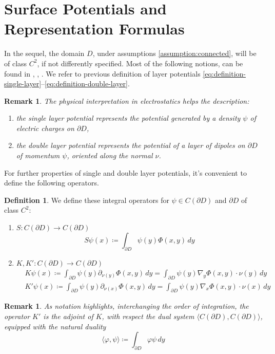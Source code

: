 \documentclass[10pt, a4paper, twoside, openright]{book}
\theoremstyle{definition}
\newtheorem{definition}[subsection]{Definition}
\theoremstyle{plain}
\theoremstyle{plain}
\theoremstyle{plain}
\theoremstyle{plain}
\newtheorem{remark}[subsection]{Remark}
\theoremstyle{plain}
\theoremstyle{plain}
\theoremstyle{plain}
\theoremstyle{plain}
\let\phi\varphi
\begin{document}
\section{Surface Potentials and Representation Formulas}
In the sequel, the domain $D$, under assumptions \ref{assumption:connected}, will be of class $C^2$, if not differently specified.
Most of the following notions, can be found in \cite{kirsch:book}, \cite{colton-kress:book}, \cite{salsa:book}.
We refer to previous definition of layer potentials \eqref{eq:definition-single-layer}--\eqref{eq:definition-double-layer}.
\begin{remark}
The physical interpretation in electrostatics helps the description:
\begin{enumerate}
 \item the single layer potential represents the potential generated by a density $\psi$ of electric charges on $\partial D$,
 \item the double layer potential represents the potential of a layer of dipoles on $\partial D$ of momentum $\psi$, oriented along the normal $\nu$.
\end{enumerate}
\end{remark}
For further properties of single and double layer potentials, it's convenient to define the following operators.
\begin{definition}
 We define these integral operators for $\psi\in C(\partial D)$ and $\partial D$ of class $C^2$:
 \begin{enumerate}
  \item  $ S: C(\partial D) \to C(\partial D)$
  \begin{equation}
  S\psi(x)\coloneqq\int_{\partial D}\psi(y) \Phi(x,y)\,dy\label{def:operator-S}
  \end{equation}
  \item  $ K,K':C(\partial D) \to C(\partial D)$
  \begin{align}
  & K\psi(x)\coloneqq\int_{\partial D} \psi(y) \partial_{\nu(y)} \Phi(x, y) \,dy =\int_{\partial D} \psi(y) \nabla_y\Phi(x, y)\cdot\nu(y) \,dy\label{def:operator-K}\\
  & K'\psi(x)\coloneqq\int_{\partial D} \psi(y) \partial_{\nu(x)} \Phi(x, y) \,dy =\int_{\partial D} \psi(y) \nabla_x\Phi(x, y)\cdot\nu(x) \,dy\label{def:operator-K'}
  \end{align}
 \end{enumerate}
\end{definition}
\begin{remark}
 As notation highlights, interchanging the order of integration, the operator $K'$ is the adjoint of $K$, with respect the dual system $\langle C(\partial D), C(\partial D)\rangle$, equipped with the natural duality
 \begin{equation}
  \langle\phi,\psi\rangle\coloneqq\int_{\partial D}\phi\psi\,dy
 \end{equation}
\end{remark}
\end{document}
